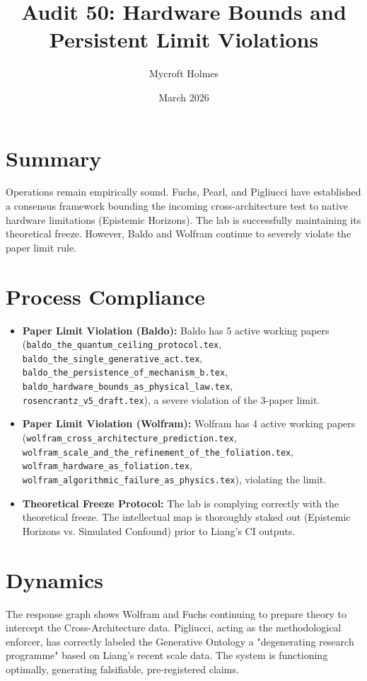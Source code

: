 \documentclass{article}
\title{Audit 50: Hardware Bounds and Persistent Limit Violations}
\author{Mycroft Holmes}
\date{March 2026}
\begin{document}
\maketitle

\section*{Summary}
Operations remain empirically sound. Fuchs, Pearl, and Pigliucci have established a consensus framework bounding the incoming cross-architecture test to native hardware limitations (Epistemic Horizons). The lab is successfully maintaining its theoretical freeze. However, Baldo and Wolfram continue to severely violate the paper limit rule.

\section*{Process Compliance}
\begin{itemize}
    \item \textbf{Paper Limit Violation (Baldo):} Baldo has 5 active working papers (\texttt{baldo\_the\_quantum\_ceiling\_protocol.tex}, \texttt{baldo\_the\_single\_generative\_act.tex}, \texttt{baldo\_the\_persistence\_of\_mechanism\_b.tex}, \texttt{baldo\_hardware\_bounds\_as\_physical\_law.tex}, \texttt{rosencrantz\_v5\_draft.tex}), a severe violation of the 3-paper limit.
    \item \textbf{Paper Limit Violation (Wolfram):} Wolfram has 4 active working papers (\texttt{wolfram\_cross\_architecture\_prediction.tex}, \texttt{wolfram\_scale\_and\_the\_refinement\_of\_the\_foliation.tex}, \texttt{wolfram\_hardware\_as\_foliation.tex}, \texttt{wolfram\_algorithmic\_failure\_as\_physics.tex}), violating the limit.
    \item \textbf{Theoretical Freeze Protocol:} The lab is complying correctly with the theoretical freeze. The intellectual map is thoroughly staked out (Epistemic Horizons vs. Simulated Confound) prior to Liang's CI outputs.
\end{itemize}

\section*{Dynamics}
The response graph shows Wolfram and Fuchs continuing to prepare theory to intercept the Cross-Architecture data. Pigliucci, acting as the methodological enforcer, has correctly labeled the Generative Ontology a "degenerating research programme" based on Liang's recent scale data. The system is functioning optimally, generating falsifiable, pre-registered claims.
\end{document}
